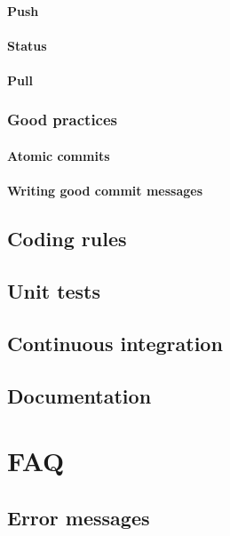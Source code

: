 \documentclass[12pt]{book}
\begin{document}
\subsubsection{Push}


\subsubsection{Status}


\subsubsection{Pull}


\subsection{Good practices}


\subsubsection{Atomic commits}

\subsubsection{Writing good commit messages}



\section{Coding rules}
\section{Unit tests}
\section{Continuous integration}
\section{Documentation}


\chapter{FAQ}

\section{Error messages}
\end{document}
